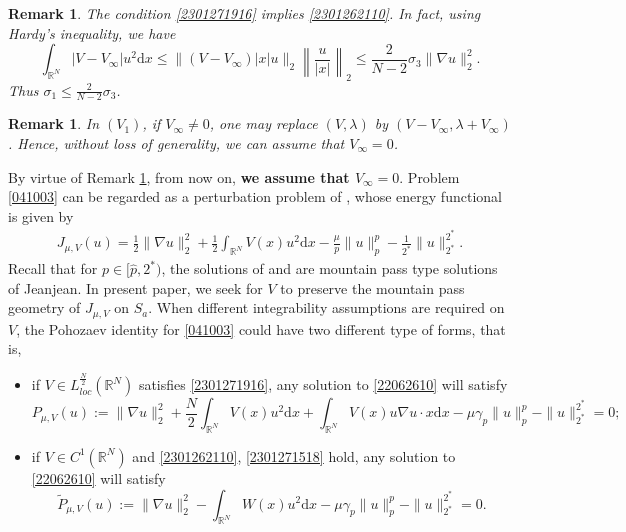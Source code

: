 \documentclass[10pt]{article}
\numberwithin{equation}{section}
\newtheorem{remark}[theorem]{Remark}
\newcommand{\ud}{\mathrm{d}}
\numberwithin{equation}{section}
\begin{document}
\begin{remark}\label{2304061410}
The condition \eqref{2301271916} implies \eqref{2301262110}. In fact, using Hardy's inequality, we have
\[
\int_{\mathbb{R}^N}\left|V-V_\infty\right|u^2 \ud x\le \|(V-V_\infty)|x|u\|_2\left\|\frac{u}{|x|}\right\|_2\le \frac{2}{N-2}\sigma_3 \|\nabla u\|_2^2.
\]
Thus $\sigma_1\le \frac{2}{N-2}\sigma_3$.
\end{remark}
\begin{remark}\label{2304121417}
In $(V_1)$, if $V_\infty\neq 0$, one may replace $(V, \lambda)$ by $(V-V_\infty, \lambda+V_\infty)$. Hence, without loss of generality, we can assume that $V_\infty=0$.
\end{remark}

By virtue of Remark \ref{2304121417}, from now on, {\bf we assume that $V_\infty=0$}. Problem \eqref{041003} can be regarded as a perturbation problem of \cite{Soave20_JFA, WW22}, whose energy functional is given by
\begin{equation*}
\begin{aligned}
J_{\mu, V}(u)=\frac{1}{2}\|\nabla u\|_2^2
+\frac12 \int_{\mathbb{R}^N} V(x)u^2 \ud x-\frac{\mu}{p}\|u\|_p^{p}
-\frac{1}{2^{*}}\|u\|_{2^*}^{2^{*}}.
\end{aligned}
\end{equation*}
Recall that for $p\in [\hat{p}, 2^*)$, the solutions of  \cite[Theorem 1.1]{Soave20_JFA} and \cite[Theorem 1.1]{WW22} are mountain pass type solutions of Jeanjean. In present paper, we seek for $V$ to preserve the mountain pass geometry of $J_{\mu, V}$ on $S_a$. When different integrability assumptions are required on $V$, the Pohozaev identity for \eqref{041003} could have two different type of forms, that is,
\begin{itemize}
\item[$(a)$]  if $V\in L_{loc}^{\frac{N}{2}}(\mathbb{R}^N)$ satisfies \eqref{2301271916}, any solution to \eqref{22062610} will satisfy
\begin{equation}\label{2306261440}
P_{\mu, V}(u):=\|\nabla u\|_2^2
+\frac{N}{2}\int_{\mathbb{R}^N}V(x)u^2 \ud x +\int_{\mathbb{R}^N}V(x)u\nabla u\cdot x \ud x-\mu\gamma_p\|u\|_p^p
-\|u\|_{2^*}^{2^*}=0;
\end{equation}
\item[$(b)$] if $V\in C^1(\mathbb{R}^N)$ and \eqref{2301262110}, \eqref{2301271518} hold, any solution to \eqref{22062610} will satisfy
\begin{equation}\label{2306261441}
\widetilde{P}_{\mu, V}(u):=\|\nabla u\|_2^2
-\int_{\mathbb{R}^N} W(x)u^2 \ud x-\mu\gamma_p\|u\|_p^p
-\|u\|_{2^*}^{2^*}=0.
\end{equation}
\end{itemize}
\end{document}
